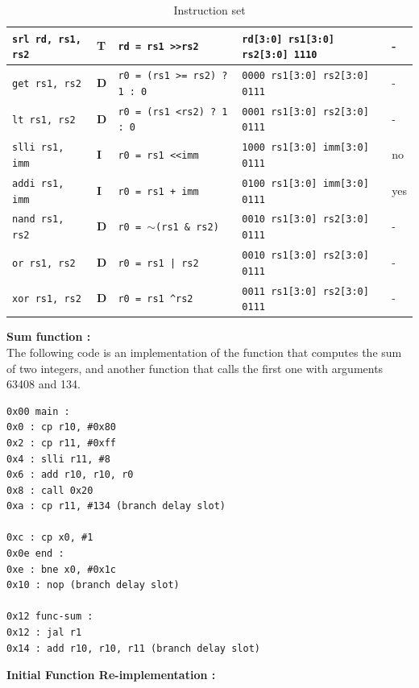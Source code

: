 \documentclass[a4paper,12pt]{article}
\begin{document}
\begin{landscape}
\begin{table}[]
\begin{tabular}{|l|l|l|l|l|}
\texttt{srl rd, rs1, rs2} & \textbf{T}    & \texttt{rd = rs1 \textgreater{}\textgreater rs2} & \texttt{rd{[}3:0{]} rs1{[}3:0{]} rs2{[}3:0{]} 1110}            & -             \\ \hline
\texttt{get rs1, rs2}     & \textbf{D}    & \texttt{r0 = (rs1 \textgreater{}= rs2) ? 1 : 0}  & \texttt{0000 rs1{[}3:0{]} rs2{[}3:0{]} 0111}                   & -             \\ \hline
\texttt{lt rs1, rs2}      & \textbf{D}    & \texttt{r0 = (rs1 \textless rs2) ? 1 : 0}        & \texttt{0001 rs1{[}3:0{]} rs2{[}3:0{]} 0111}                   & -             \\ \hline
\texttt{slli rs1, imm}   & \textbf{I}    & \texttt{r0 = rs1 \textless{}\textless imm}       & \texttt{1000 rs1{[}3:0{]} imm{[}3:0{]} 0111}                   & no            \\ \hline
\texttt{addi rs1, imm}    & \textbf{I}    & \texttt{r0 = rs1 + imm}& \texttt{0100 rs1{[}3:0{]} imm{[}3:0{]} 0111}                   & yes\\ \hline
\texttt{nand rs1, rs2}    & \textbf{D}    & \texttt{r0 = $\sim$(rs1 \& rs2)}                 & \texttt{0010 rs1{[}3:0{]} rs2{[}3:0{]} 0111}                   & -             \\ \hline
\texttt{or rs1, rs2}      & \textbf{D}    & \texttt{r0 = rs1 | rs2}                          & \texttt{0010 rs1{[}3:0{]} rs2{[}3:0{]} 0111}                   & -             \\ \hline
\texttt{xor rs1, rs2}     & \textbf{D}    & \texttt{r0 = rs1 \textasciicircum rs2}           & \texttt{0011 rs1{[}3:0{]} rs2{[}3:0{]} 0111}                   & -             \\ \hline
\end{tabular}
\caption{Instruction set}
\end{table}
\label{tab:instruction_set}
\end{landscape}
\textbf{Sum function :}\\

The following code is an implementation of the function that computes the sum of two integers, and another function that calls the first one with arguments 63408 and 134.
\begin{verbatim}
0x00 main :
0x0 : cp r10, #0x80
0x2 : cp r11, #0xff
0x4 : slli r11, #8
0x6 : add r10, r10, r0
0x8 : call 0x20
0xa : cp r11, #134 (branch delay slot)
    
0xc : cp x0, #1
0x0e end :
0xe : bne x0, #0x1c
0x10 : nop (branch delay slot)
    
0x12 func-sum :
0x12 : jal r1
0x14 : add r10, r10, r11 (branch delay slot)
\end{verbatim}
\textbf{Initial Function Re-implementation :}\\
\end{document}
